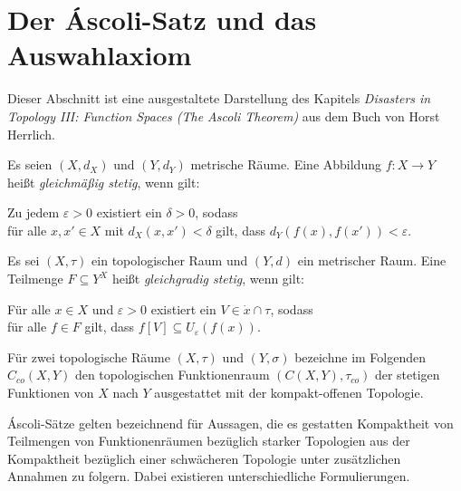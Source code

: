 \section{Der Áscoli-Satz und das Auswahlaxiom}

Dieser Abschnitt ist eine ausgestaltete Darstellung des Kapitels \textit{Disasters in Topology III: Function Spaces (The Ascoli Theorem)} aus dem Buch von Horst Herrlich.

\begin{defn}
  Es seien $(X,d_X)$ und $(Y,d_Y)$ metrische Räume. Eine Abbildung $f \colon X \to Y$ heißt \textit{gleichmäßig stetig}, wenn gilt:
  \begin{addmargin}[2em]{2em}%
  Zu jedem $\varepsilon > 0$ existiert ein $\delta > 0$, sodass \\
  für alle $x,x' \in X$ mit $d_X(x,x') < \delta$ gilt, dass $d_Y(f(x),f(x')) < \varepsilon$.
  \end{addmargin}
\end{defn}

\begin{defn}
  Es sei $(X,\tau)$ ein topologischer Raum und $(Y,d)$ ein metrischer Raum. Eine Teilmenge $F \subseteq Y^X$ heißt \textit{gleichgradig stetig}, wenn gilt:
  \begin{addmargin}[2em]{2em}%
    Für alle $x \in X$ und $\varepsilon > 0$ existiert ein $V \in \dot{x} \cap \tau$, sodass \\
    für alle $f \in F$ gilt, dass $f[V] \subseteq U_\varepsilon(f(x))$.
  \end{addmargin}
\end{defn}

Für zwei topologische Räume $(X,\tau)$ und $(Y,\sigma)$ bezeichne im Folgenden $C_{co}(X,Y)$ den topologischen Funktionenraum $(C(X,Y),\tau_{co})$ der stetigen Funktionen von $X$ nach $Y$ ausgestattet mit der kompakt-offenen Topologie.

Áscoli-Sätze gelten bezeichnend für Aussagen, die es gestatten Kompaktheit von Teilmengen von Funktionenräumen bezüglich starker Topologien aus der Kompaktheit bezüglich einer schwächeren Topologie unter zusätzlichen Annahmen zu folgern. Dabei existieren unterschiedliche Formulierungen.

